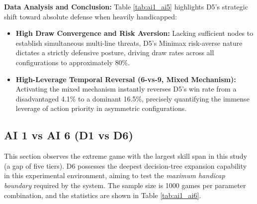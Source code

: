 \textbf{Data Analysis and Conclusion:} 
Table \ref{tab:ai1_ai5} highlights D5's strategic shift toward absolute defense when heavily handicapped:
\begin{itemize}
    \item \textbf{High Draw Convergence and Risk Aversion:} Lacking sufficient nodes to establish simultaneous multi-line threats, D5's Minimax risk-averse nature dictates a strictly defensive posture, driving draw rates across all configurations to approximately 80\%.
    \item \textbf{High-Leverage Temporal Reversal (6-vs-9, Mixed Mechanism):} Activating the mixed mechanism instantly reverses D5's win rate from a disadvantaged 4.1\% to a dominant 16.5\%, precisely quantifying the immense leverage of action priority in asymmetric configurations.
\end{itemize}

\subsection{AI 1 vs AI 6 (D1 vs D6)}
\label{subsec:ai1_ai6}

This section observes the extreme game with the largest skill span in this study (a gap of five tiers). D6 possesses the deepest decision-tree expansion capability in this experimental environment, aiming to test the \emph{maximum handicap boundary} required by the system. The sample size is 1000 games per parameter combination, and the statistics are shown in Table \ref{tab:ai1_ai6}.

\begin{table}[htbp]
    \centering
    \caption{AI 1 vs AI 6 Simulation Data Distribution (Sample Size=1000)}
    \label{tab:ai1_ai6}
\end{table}

